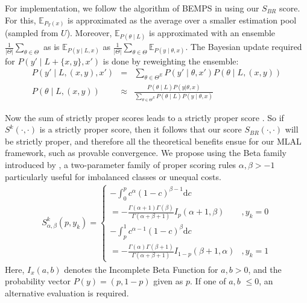 \documentclass[letterpaper]{article} %
\begin{document}
For implementation, we follow the algorithm of BEMPS in  \cite{TanDuBun-IEEEPAMI23} using our $S_{BR}$ score.
For this,
$\mathbb{E}_{P_T(x)}$ is approximated as the average over a smaller estimation pool (sampled from $U$). Moreover, $\mathbb{E}_{ P(\theta \mid L) }$ is approximated with an ensemble $\frac{1}{|\Theta|}\sum_{\theta\in\Theta} $
 as is
$\mathbb{E}_{ P(y \mid L,x) }$ as
$\frac{1}{|\Theta|}\sum_{\theta\in\Theta} \mathbb{E}_{ P(y \mid \theta,x) }$.  The Bayesian update required for $P(y' \mid L+\{x,y\},x')$ is done by reweighting the ensemble:
{\scriptsize
\begin{eqnarray}
    P(y' \mid L, (x, y), x') &=& \sum_{\theta\in\Theta^E} P(y' \mid \theta, x') P(\theta \mid L, (x, y))
    \label{eq-3}\\
P(\theta \mid L, (x, y)) & \approx&
\frac{P(\theta \mid L) P(y|\theta,x)}
    {\sum_{\theta\in\Theta^E} P(\theta\mid L) P(y \mid \theta,x)} \label{eq-4}
\end{eqnarray} }

Now the sum of strictly proper scores leads to a strictly proper score \cite{dawid2014theory}.  So if $S^k(\cdot,\cdot)$ is a strictly proper score, then it follows that our  score $S_{BR}(\cdot,\cdot)$ will be strictly proper, and therefore all the theoretical benefits ensue for our MLAL framework, such as provable convergence.
We propose using the Beta family introduced by \cite{Buja2005Loss}, a two-parameter family of proper scoring rules
$\alpha,\beta > -1$ particularly useful for imbalanced classes or unequal costs.
{\scriptsize
\begin{eqnarray}
\label{eq-Sbeta}
S^k_{\alpha,\beta}(p,y_k) = \left\{
  \begin{array}{lr}
    - \int_0^p c^\alpha (1-c)^{\beta-1} \mbox{d}c  \\ =
         - \frac{\Gamma(\alpha+1)\Gamma(\beta)}{\Gamma(\alpha+\beta+1)} I_p(\alpha+1,\beta)
          & , y_k=0\\
    - \int_p^1 c^{\alpha-1} (1-c)^{\beta} \mbox{d}c \\
    =
         - \frac{\Gamma(\alpha)\Gamma(\beta+1)}{\Gamma(\alpha+\beta+1)} I_{1-p}(\beta+1,\alpha) & ,y_k=1
\end{array} \right.
\end{eqnarray}}
\noindent
Here, $I_x(a,b)$ denotes the Incomplete Beta Function for $a,b>0$,
and the probability vector $P(y)=(p, 1-p)$ given as $p$.
If one of $a,b$ $\le 0$, an alternative evaluation is required.
\end{document}
